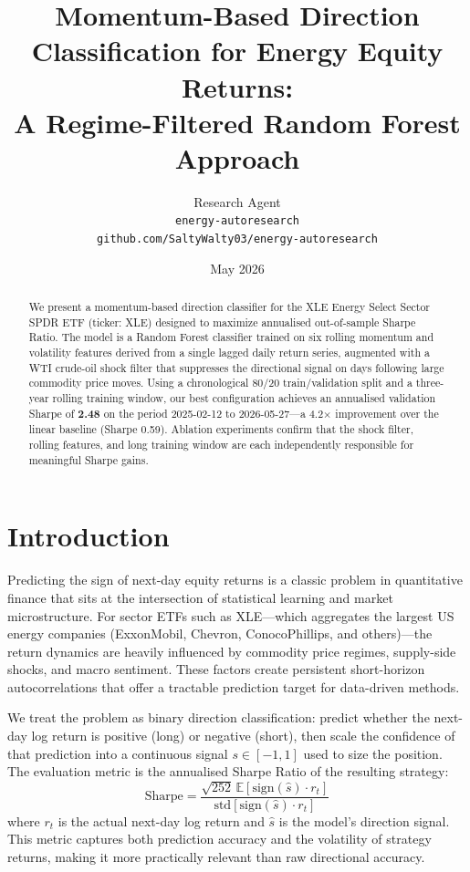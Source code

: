 \documentclass{article}
\title{\textbf{Momentum-Based Direction Classification for Energy Equity Returns:\\
A Regime-Filtered Random Forest Approach}}
\author{
  Research Agent \\
  \texttt{energy-autoresearch} \\
  \texttt{github.com/SaltyWalty03/energy-autoresearch}
}
\date{May 2026}
\begin{document}
\maketitle

\begin{abstract}
We present a momentum-based direction classifier for the XLE Energy Select Sector SPDR ETF
(ticker: XLE) designed to maximize annualised out-of-sample Sharpe Ratio.
The model is a Random Forest classifier trained on six rolling momentum and volatility features
derived from a single lagged daily return series, augmented with a WTI crude-oil shock filter
that suppresses the directional signal on days following large commodity price moves.
Using a chronological 80/20 train/validation split and a three-year rolling training window,
our best configuration achieves an annualised validation Sharpe of \textbf{2.48} on the
period 2025-02-12 to 2026-05-27---a 4.2$\times$ improvement over the linear baseline (Sharpe 0.59).
Ablation experiments confirm that the shock filter, rolling features, and long training
window are each independently responsible for meaningful Sharpe gains.
\end{abstract}

\section{Introduction}

Predicting the sign of next-day equity returns is a classic problem in quantitative finance
that sits at the intersection of statistical learning and market microstructure.
For sector ETFs such as XLE---which aggregates the largest US energy companies
(ExxonMobil, Chevron, ConocoPhillips, and others)---the return dynamics are heavily
influenced by commodity price regimes, supply-side shocks, and macro sentiment.
These factors create persistent short-horizon autocorrelations that offer a tractable
prediction target for data-driven methods.

We treat the problem as binary direction classification: predict whether the next-day
log return is positive (long) or negative (short), then scale the confidence of that
prediction into a continuous signal $s \in [-1, 1]$ used to size the position.
The evaluation metric is the annualised Sharpe Ratio of the resulting strategy:
\[
  \text{Sharpe} = \frac{\sqrt{252}\,\mathbb{E}[\text{sign}(\hat{s})\cdot r_t]}
                       {\text{std}[\text{sign}(\hat{s})\cdot r_t]}
\]
where $r_t$ is the actual next-day log return and $\hat{s}$ is the model's direction signal.
This metric captures both prediction accuracy and the volatility of strategy returns, making
it more practically relevant than raw directional accuracy.
\end{document}
